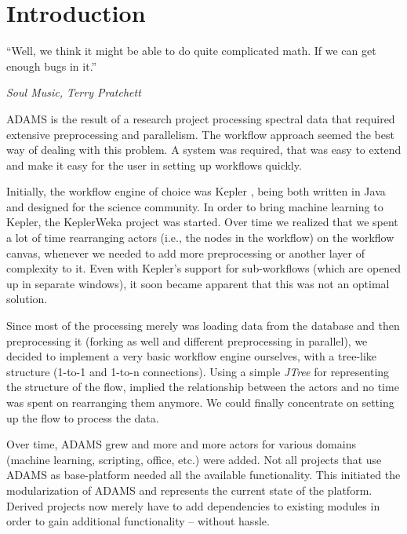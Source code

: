 
\chapter{Introduction}

\epigraph{``Well, we think it might be able to do quite complicated math. If we can get enough bugs in it.''}{\textit{Soul Music, Terry Pratchett}}

ADAMS is the result of a research project processing spectral data that
required extensive preprocessing and parallelism. The workflow approach seemed
the best way of dealing with this problem. A system was required, that was easy
to extend and make it easy for the user in setting up workflows quickly.

Initially, the workflow engine of choice was Kepler \cite{kepler}, being both
written in Java and designed for the science community. In order to bring
machine learning to Kepler, the KeplerWeka project \cite{keplerweka} was
started. Over time we realized that we spent a lot of time rearranging actors
(i.e., the nodes in the workflow) on the workflow canvas, whenever we needed to
add more preprocessing or another layer of complexity to it. Even with Kepler's
support for sub-workflows (which are opened up in separate windows), it soon
became apparent that this was not an optimal solution.

Since most of the processing merely was loading data from the database and
then preprocessing it (forking as well and different preprocessing in
parallel), we decided to implement a very basic workflow engine ourselves, with
a tree-like structure (1-to-1 and 1-to-n connections). Using a simple
\textit{JTree} for representing the structure of the flow, implied the
relationship between the actors and no time was spent on rearranging them
anymore. We could finally concentrate on setting up the flow to process the
data.

Over time, ADAMS grew and more and more actors for various domains (machine
learning, scripting, office, etc.) were added. Not all projects that use ADAMS
as base-platform needed all the available functionality. This initiated the
modularization of ADAMS and represents the current state of the platform.
Derived projects now merely have to add dependencies to existing modules in
order to gain additional functionality -- without hassle. \\


